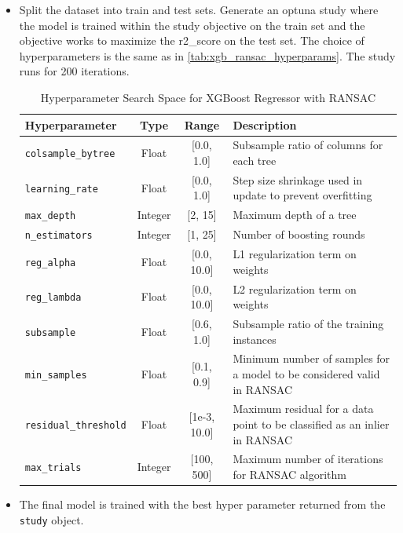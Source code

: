 \documentclass{iutbscthesis}
\begin{document}
\begin{itemize}
    \item Split the dataset into train and test sets. Generate an optuna study\cite{akiba2019optuna} where the model is trained 
    within the study objective on the train set and the objective works to maximize the r2\_score on the test set. The choice of hyperparameters is the same as in \autoref{tab:xgb_ransac_hyperparams}. The study runs for 200 iterations.
    \begin{table}[H]
    \centering
    \caption{Hyperparameter Search Space for XGBoost Regressor with RANSAC}
    \label{tab:xgb_ransac_hyperparams}

        \begin{adjustbox}{max width=0.7\textwidth}
            \begin{tabular}{|l|c|c|p{}|}
                \hline
                \textbf{Hyperparameter} & \textbf{Type} & \textbf{Range} & \textbf{Description} \\
                \hline
                \texttt{colsample\_bytree} & Float & [0.0, 1.0] & Subsample ratio of columns for each tree \\
                \texttt{learning\_rate} & Float & [0.0, 1.0] & Step size shrinkage used in update to prevent overfitting \\
                \texttt{max\_depth} & Integer & [2, 15] & Maximum depth of a tree \\
                \texttt{n\_estimators} & Integer & [1, 25] & Number of boosting rounds \\
                \texttt{reg\_alpha} & Float & [0.0, 10.0] & L1 regularization term on weights \\
                \texttt{reg\_lambda} & Float & [0.0, 10.0] & L2 regularization term on weights \\
                \texttt{subsample} & Float & [0.6, 1.0] & Subsample ratio of the training instances \\
                \texttt{min\_samples} & Float & [0.1, 0.9] & Minimum number of samples for a model to be considered valid in RANSAC \\
                \texttt{residual\_threshold} & Float & [1e-3, 10.0] & Maximum residual for a data point to be classified as an inlier in RANSAC \\
                \texttt{max\_trials} & Integer & [100, 500] & Maximum number of iterations for RANSAC algorithm \\
                \hline
            \end{tabular}          
        \end{adjustbox}
    \end{table}
    

    
    \item The final model is trained with the best hyper parameter returned from the \texttt{study} object.

\end{itemize}
\end{document}
